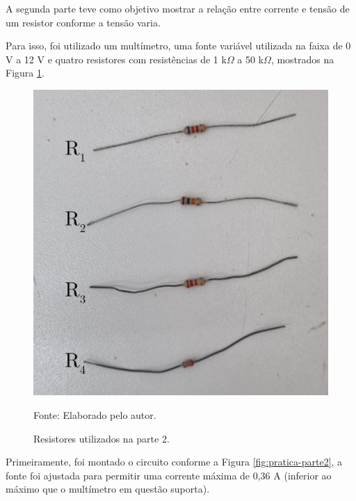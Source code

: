 \documentclass[12pt]{article}
\begin{document}
A segunda parte teve como objetivo mostrar a relação entre corrente e tensão de um resistor conforme a tensão varia.

Para isso, foi utilizado um multímetro, uma fonte variável utilizada na faixa de 0 V a 12 V e quatro resistores com resistências de 1 k$\Omega$ a 50 k$\Omega$, mostrados na Figura \ref{fig:pratica2}.

\begin{figure}[H]
    \centering
    \caption{Resistores utilizados na parte 2.}
    \begin{minipage}{0.45\textwidth}
        \centering
        \includegraphics[width=\textwidth]{external-figures/resistores-pratica2.png}\\
        \raggedright\footnotesize{Fonte: Elaborado pelo autor.}
        \label{fig:pratica2}
    \end{minipage}
\end{figure}

Primeiramente, foi montado o circuito conforme a Figura \ref{fig:pratica-parte2}, a fonte foi ajustada para permitir uma corrente máxima de 0,36 A (inferior ao máximo que o multímetro em questão suporta).
\end{document}
